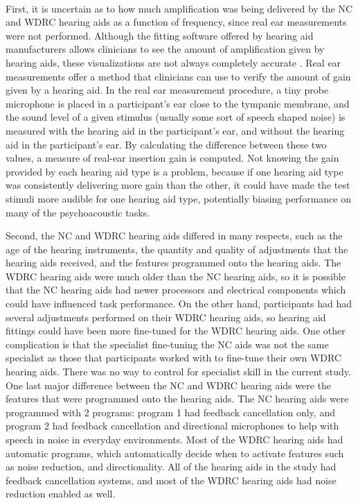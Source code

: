 \paragraph{}First, it is uncertain as to how much amplification was being delivered by the NC and WDRC hearing aids as a function of frequency, since real ear measurements were not performed.  Although the fitting software offered by hearing aid manufacturers allows clinicians to see the amount of amplification given by hearing aids, these visualizations are not always completely accurate \cite{Hawkins2003}.  Real ear measurements offer a method that clinicians can use to verify the amount of gain given by a hearing aid.  In the real ear measurement procedure, a tiny probe microphone is placed in a participant's ear close to the tympanic membrane, and the sound level of a given stimulus (usually some sort of speech shaped noise) is measured with the hearing aid in the participant's ear, and without the hearing aid in the participant's ear.  By calculating the difference between these two values, a measure of real-ear insertion gain is computed.  Not knowing the gain provided by each hearing aid type is a problem, because if one hearing aid type was consistently delivering more gain than the other, it could have made the test stimuli more audible for one hearing aid type, potentially biasing performance on many of the psychoacoustic tasks.

Second, the NC and WDRC hearing aids differed in many respects, such as the age of the hearing instruments, the quantity and quality of adjustments that the hearing aids received, and the features programmed onto the hearing aids.  The WDRC hearing aids were much older than the NC hearing aids, so it is possible that the NC hearing aids had newer processors and electrical components which could have influenced task performance.  On the other hand, participants had had several adjustments performed on their WDRC hearing aids, so hearing aid fittings could have been more fine-tuned for the WDRC hearing aids.  One other complication is that the specialist fine-tuning the NC aids was not the same specialist as those that participants worked with to fine-tune their own WDRC hearing aids.  There was no way to control for specialist skill in the current study.  One last major difference between the NC and WDRC hearing aids were the features that were programmed onto the hearing aids.  The NC hearing aids were programmed with 2 programs: program 1 had feedback cancellation only, and program 2 had feedback cancellation and directional microphones to help with speech in noise in everyday environments.  Most of the WDRC hearing aids had automatic programs, which automatically decide when to activate features such as noise reduction, and directionality.  All of the hearing aids in the study had feedback cancellation systems, and most of the WDRC hearing aids had noise reduction enabled as well.

